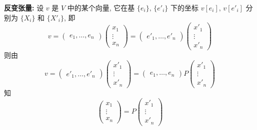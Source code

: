     \textbf{反变张量: }设 $v$ 是 $V$ 中的某个向量, 它在基 $\{e_i\},\,\{{e'}_i\}$ 下的坐标 $v[e_i],\,v[{e'}_i]$ 分别为 $\{X_i\}$ 和 $\{{X'}_i\}$, 即
    \begin{equation*}
        v = 
        \begin{pmatrix}
            e_1,\dots,e_n
        \end{pmatrix}
        \begin{pmatrix}
            x_1 \\ \vdots \\ x_n
        \end{pmatrix} = 
        \begin{pmatrix}
            {e'}_1,\dots,{e'}_n
        \end{pmatrix}
        \begin{pmatrix}
            {x'}_1 \\ \vdots \\ {x'}_n
        \end{pmatrix}
    \end{equation*}
    则由
    \begin{equation*}
        v = 
        \begin{pmatrix}
            {e'}_1,\dots,{e'}_n
        \end{pmatrix}
        \begin{pmatrix}
            {x'}_1 \\ \vdots \\ {x'}_n
        \end{pmatrix} = 
        \begin{pmatrix}
            e_1,\dots,e_n
        \end{pmatrix}
        P
        \begin{pmatrix}
            {x'}_1 \\ \vdots \\ {x'}_n
        \end{pmatrix}
    \end{equation*}
    知
    \begin{equation*}
        \begin{pmatrix}
            x_1 \\ \vdots \\ x_n
        \end{pmatrix} = 
        P
        \begin{pmatrix}
            {x'}_1 \\ \vdots \\ {x'}_n
        \end{pmatrix}
    \end{equation*}
